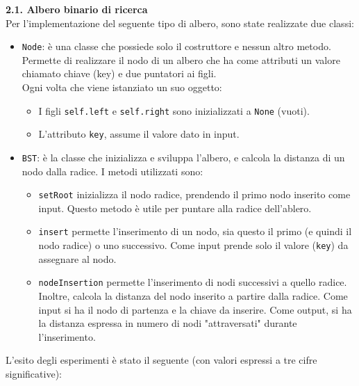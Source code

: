 \documentclass[]{article}
\begin{document}
\newpage
{\large \textbf{{\Large{2}}.{\small{1}}. Albero binario di ricerca}}\\
Per l'implementazione del seguente tipo di albero, sono state realizzate due classi:
\begin{itemize}
    \item \texttt{Node}: è una classe che possiede solo il costruttore e nessun altro metodo. Permette di realizzare il nodo di un albero che ha come attributi un valore chiamato chiave (key) e due puntatori ai figli.\\
          Ogni volta che viene istanziato un suo oggetto:
          \begin{itemize}
            \item I figli \texttt{self.left} e \texttt{self.right} sono inizializzati a \texttt{None} (vuoti).
            \item L'attributo \texttt{key}, assume il valore dato in input.
          \end{itemize}  
    \item \texttt{BST}: è la classe che inizializza e sviluppa l'albero, e calcola la distanza di un nodo dalla radice. I metodi utilizzati sono:
          \begin{itemize}
            \item \texttt{setRoot} inizializza il nodo radice, prendendo il primo nodo inserito come input. Questo metodo è utile per puntare alla radice dell'ablero.
            \item \texttt{insert} permette l'inserimento di un nodo, sia questo il primo (e quindi il nodo radice) o uno successivo. Come input prende solo il valore (\texttt{key}) da assegnare al nodo.
            \item \texttt{nodeInsertion} permette l'inserimento di nodi successivi a quello radice. Inoltre, calcola la distanza del nodo inserito a partire dalla radice. 
                  Come input si ha il nodo di partenza e la chiave da inserire. Come output, si ha la distanza espressa in numero di nodi "attraversati" durante l'inserimento.
          \end{itemize}  
\end{itemize}
\newpage
L'esito degli esperimenti è stato il seguente (con valori espressi a tre cifre significative):\\ 
\end{document}
